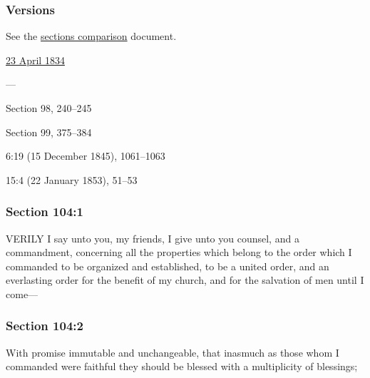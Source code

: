 	\subsubsection{Versions}
		\label{DC104-V}
		
		See the \href{https://drive.google.com/file/d/1goAvNz8jS4R8slYfMG_db55Ty2z_vmgK/view?usp=sharing}{sections comparison} document.
	
		\begin{compactdesc}
			\item[JSP] \hyperref[EMS-1834-JS-23-APR-1834]{23 April 1834}
			\item[BC] ---
			\item[DC 1835] Section 98, 240--245
			\item[DC 1844] Section 99, 375--384
			\item[TS] 6:19 (15 December 1845), 1061--1063
			\item[MS] 15:4 (22 January 1853), 51--53
		\end{compactdesc}

	\subsubsection{Section 104:1} %
		\label{DC104-1}

		VERILY I say unto you, my friends, I give unto you counsel, and a commandment, concerning all the properties which belong to the order which I commanded to be organized and established, to be a united order, and an everlasting order for the benefit of my church, and for the salvation of men until I come---


	\subsubsection{Section 104:2} %
		\label{DC104-2}

		With promise immutable and unchangeable, that inasmuch as those whom I commanded were faithful they should be blessed with a multiplicity of blessings;

